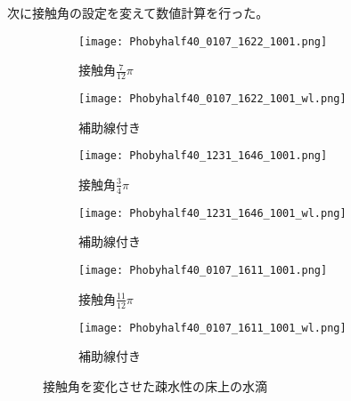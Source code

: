 \documentclass[]{jsarticle}
\begin{document}
次に接触角の設定を変えて数値計算を行った。
\begin{figure}[H]
  \centering
  \begin{subfigure}{0.3\columnwidth}
    \centering
    \texttt{[image: Phobyhalf40\_0107\_1622\_1001.png]}
    \caption{接触角$\frac{7}{12}\pi$}
    \label{fig:phoby_pi3}
  \end{subfigure}
  \begin{subfigure}{0.6\columnwidth}
    \centering
    \texttt{[image: Phobyhalf40\_0107\_1622\_1001\_wl.png]}
    \caption{補助線付き}
    \label{fig:phoby_pi3wl}
  \end{subfigure}

  \begin{subfigure}{0.3\columnwidth}
    \centering
    \texttt{[image: Phobyhalf40\_1231\_1646\_1001.png]}
    \caption{接触角$\frac{3}{4}\pi$}
    \label{fig:phoby_pi4}
  \end{subfigure}
  \begin{subfigure}{0.6\columnwidth}
    \centering
    \texttt{[image: Phobyhalf40\_1231\_1646\_1001\_wl.png]}
    \caption{補助線付き}
    \label{fig:phoby_pi4wl}
  \end{subfigure}

  \begin{subfigure}{0.3\columnwidth}
    \centering
    \texttt{[image: Phobyhalf40\_0107\_1611\_1001.png]}
    \caption{接触角$\frac{11}{12}\pi$}
    \label{fig:phoby_pi6}
  \end{subfigure}
  \begin{subfigure}{0.6\columnwidth}
    \centering
    \texttt{[image: Phobyhalf40\_0107\_1611\_1001\_wl.png]}
    \caption{補助線付き}
    \label{fig:phoby_pi6wl}
  \end{subfigure}

  \caption{接触角を変化させた疎水性の床上の水滴}
\end{figure}
\end{document}
